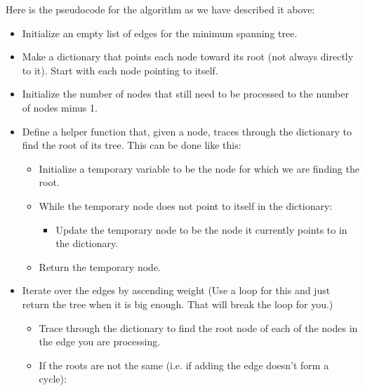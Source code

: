 Here is the pseudocode for the algorithm as we have described it above:

\begin{itemize}

\item Initialize an empty list of edges for the minimum spanning tree.

\item Make a dictionary that points each node toward its root (not always directly to it).
Start with each node pointing to itself.

\item Initialize the number of nodes that still need to be processed to the number of nodes minus 1.

\item Define a helper function that, given a node, traces through the dictionary to find the root of its tree.
This can be done like this:

	\begin{itemize}

	\item Initialize a temporary variable to be the node for which we are finding the root.

	\item While the temporary node does not point to itself in the dictionary:

		\begin{itemize}

		\item Update the temporary node to be the node it currently points to in the dictionary.

		\end{itemize}

	\item Return the temporary node.

	\end{itemize}

\item Iterate over the edges by ascending weight (Use a  loop for this and just return the tree when it is big enough. That will break the loop for you.)

	\begin{itemize}

	\item Trace through the dictionary to find the root node of each of the nodes in the edge you are processing.

	\item If the roots are not the same (i.e. if adding the edge doesn't form a cycle):


\end{itemize}
\end{itemize}
